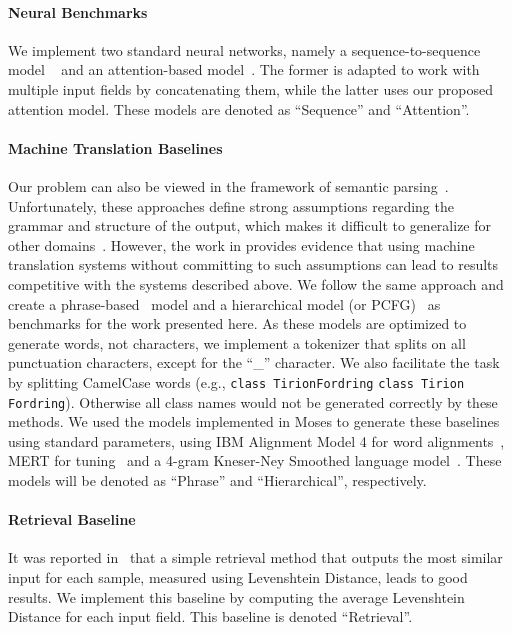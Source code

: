 \documentclass[11pt]{article}
\begin{document}
\paragraph{Neural Benchmarks} We implement two standard
neural networks, namely a sequence-to-sequence model
~\cite{DBLP:journals/corr/SutskeverVL14} and an attention-based
model~\cite{DBLP:journals/corr/BahdanauCB14}. The former is
adapted to work with multiple input fields by concatenating them,
while the latter uses our proposed attention model. These models
are denoted as ``Sequence'' and ``Attention''.

\paragraph{Machine Translation Baselines} Our problem can also be viewed in the
framework of semantic
parsing~\cite{Wong:2006:LSP:1220835.1220891,Lu:2008:GMP:1613715.1613815,Jones:2012:SPB:2390524.2390593,artzi-lee-zettlemoyer:2015:EMNLP}.
Unfortunately, these approaches define strong assumptions regarding the grammar and
structure of the output, which makes it difficult to generalize for other
domains~\cite{Kwiatkowski:2010:IPC:1870658.1870777}.
However, the work in  provides evidence
that using machine translation systems without committing to such assumptions
can lead to results competitive with the systems described above.  We follow the
same approach and create a
phrase-based~\cite{Koehn:2007:MOS:1557769.1557821} model and a hierarchical
model (or PCFG)~\cite{Chiang:2007:HPT:1268656.1268659} as benchmarks for the
work presented here.
As these models are optimized to generate words, not characters, we
implement a tokenizer that splits on all punctuation characters, except for
the ``\_'' character. We also facilitate the task by splitting CamelCase words
(e.g., \texttt{class TirionFordring}  \texttt{class Tirion Fordring}). Otherwise all
class names would not be generated correctly by these methods. We used the models implemented in
Moses to generate these baselines using standard parameters, using IBM Alignment
Model 4 for word alignments~\cite{Och:2003:SCV:778822.778824}, MERT for
tuning~\cite{Sokolov11minimum} and a 4-gram Kneser-Ney Smoothed language
model~\cite{citeulike:13570576}. These models will be denoted as ``Phrase'' and
``Hierarchical'', respectively.



\paragraph{Retrieval Baseline} It was reported in~\cite{quirk:acl15} that a
simple retrieval method that outputs the most similar input for each sample, measured
using Levenshtein Distance, leads to good results.
We implement this baseline by computing the average Levenshtein Distance for each input field.
This baseline is denoted ``Retrieval''.
\end{document}
